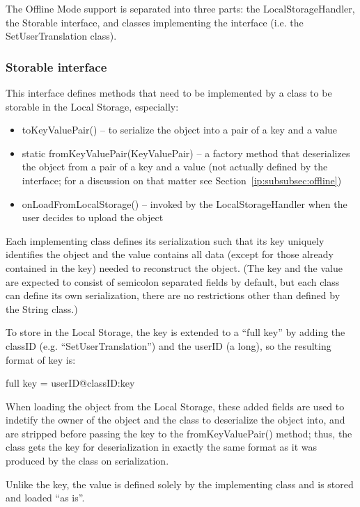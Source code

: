 The Offline Mode support is separated into three parts: the LocalStorageHandler, the Storable interface, and classes implementing the interface (i.e. the SetUserTranslation class).

\subsubsection{Storable interface}
\label{gui:subsubsec:storable}

This interface defines methods that need to be implemented by a class to be storable in the Local Storage, especially:

\begin{itemize}
\item toKeyValuePair() -- to serialize the object into a pair of a key and a value

\item static fromKeyValuePair(KeyValuePair) -- a factory method that deserializes the object from a pair of a key and a value (not actually defined by the interface; for a discussion on that matter see Section~\ref{ip:subsubsec:offline})

\item onLoadFromLocalStorage() -- invoked by the LocalStorageHandler when the user decides to upload the object
\end{itemize}

Each implementing class defines its serialization such that its key uniquely identifies the object and the value contains all data (except for those already contained in the key) needed to reconstruct the object.
(The key and the value are expected to consist of semicolon separated fields by default, but each class can define its own serialization, there are no restrictions other than defined by the String class.)

To store in the Local Storage, the key is extended to a ``full key'' by adding the classID (e.g. ``SetUserTranslation'') and the userID (a long),
so the resulting format of key is:

full key = userID@classID:key

When loading the object from the Local Storage, these added fields are used to indetify the owner of the object and the class to deserialize the object into, and are stripped before passing the key to the fromKeyValuePair() method; thus, the class gets the key for deserialization in exactly the same format as it was produced by the class on serialization.

Unlike the key, the value is defined solely by the implementing class and is stored and loaded ``as is''.

